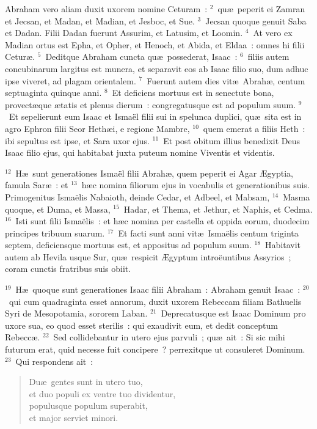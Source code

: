 \lettrine[lines=3,image=true,loversize=0.05,lraise=-0.03]{A}{}braham vero aliam duxit uxorem nomine Ceturam~:
${}^{2}$~qu\ae\ peperit ei Zamran et Jecsan, et Madan, et Madian, et Jesboc, et Sue.
${}^{3}$~Jecsan quoque genuit Saba et Dadan. Filii Dadan fuerunt Assurim, et Latusim, et Loomin.
${}^{4}$~At vero ex Madian ortus est Epha, et Opher, et Henoch, et Abida, et Eldaa~: omnes hi filii Cetur\ae .
${}^{5}$~Deditque Abraham cuncta qu\ae\ possederat, Isaac~:
${}^{6}$~filiis autem concubinarum largitus est munera, et separavit eos ab Isaac filio suo, dum adhuc ipse viveret, ad plagam orientalem.
${}^{7}$~Fuerunt autem dies vit\ae\ Abrah\ae , centum septuaginta quinque anni.
${}^{8}$~Et deficiens mortuus est in senectute bona, provect\ae que \ae tatis et plenus dierum~: congregatusque est ad populum suum.
${}^{9}$~Et sepelierunt eum Isaac et Isma\"el filii sui in spelunca duplici, qu\ae\ sita est in agro Ephron filii Seor Heth\ae i, e regione Mambre,
${}^{10}$~quem emerat a filiis Heth~: ibi sepultus est ipse, et Sara uxor ejus.
${}^{11}$~Et post obitum illius benedixit Deus Isaac filio ejus, qui habitabat juxta puteum nomine Viventis et videntis.


${}^{12}$~H\ae\ sunt generationes Isma\"el filii Abrah\ae , quem peperit ei Agar \AE gyptia, famula Sar\ae~: et
${}^{13}$~h\ae c nomina filiorum ejus in vocabulis et generationibus suis. Primogenitus Isma\"elis Nabaioth, deinde Cedar, et Adbeel, et Mabsam,
${}^{14}$~Masma quoque, et Duma, et Massa,
${}^{15}$~Hadar, et Thema, et Jethur, et Naphis, et Cedma.
${}^{16}$~Isti sunt filii Isma\"elis~: et h\ae c nomina per castella et oppida eorum, duodecim principes tribuum suarum.
${}^{17}$~Et facti sunt anni vit\ae\ Isma\"elis centum triginta septem, deficiensque mortuus est, et appositus ad populum suum.
${}^{18}$~Habitavit autem ab Hevila usque Sur, qu\ae\ respicit \AE gyptum intro\"euntibus Assyrios~; coram cunctis fratribus suis obiit.


${}^{19}$~H\ae\ quoque sunt generationes Isaac filii Abraham~: Abraham genuit Isaac~:
${}^{20}$~qui cum quadraginta esset annorum, duxit uxorem Rebeccam filiam Bathuelis Syri de Mesopotamia, sororem Laban.
${}^{21}$~Deprecatusque est Isaac Dominum pro uxore sua, eo quod esset sterilis~: qui exaudivit eum, et dedit conceptum Rebecc\ae .
${}^{22}$~Sed collidebantur in utero ejus parvuli~; qu\ae\ ait~: Si sic mihi futurum erat, quid necesse fuit concipere~? perrexitque ut consuleret Dominum.
${}^{23}$~Qui respondens ait~: \begin{flushleft}\begin{verse}Du\ae\ gentes sunt in utero tuo,\\ et duo populi ex ventre tuo dividentur,\\ populusque populum superabit,\\ et major serviet minori.\end{verse}\end{flushleft}


